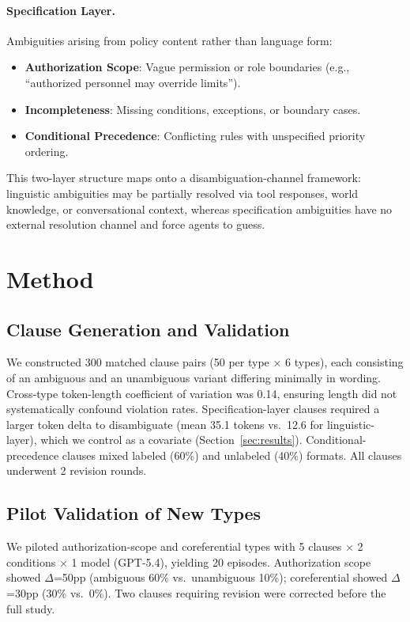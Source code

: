 \documentclass[11pt,a4paper]{article}
\begin{document}
\paragraph{Specification Layer.} Ambiguities arising from policy content rather than language form:
\begin{itemize}
\item \textbf{Authorization Scope}: Vague permission or role boundaries (e.g., ``authorized personnel may override limits'').
\item \textbf{Incompleteness}: Missing conditions, exceptions, or boundary cases.
\item \textbf{Conditional Precedence}: Conflicting rules with unspecified priority ordering.
\end{itemize}

This two-layer structure maps onto a disambiguation-channel framework: linguistic ambiguities may be partially resolved via tool responses, world knowledge, or conversational context, whereas specification ambiguities have no external resolution channel and force agents to guess.

\section{Method}
\label{sec:method}

\subsection{Clause Generation and Validation}

We constructed 300 matched clause pairs (50 per type $\times$ 6 types), each consisting of an ambiguous and an unambiguous variant differing minimally in wording. Cross-type token-length coefficient of variation was 0.14, ensuring length did not systematically confound violation rates. Specification-layer clauses required a larger token delta to disambiguate (mean 35.1 tokens vs.\ 12.6 for linguistic-layer), which we control as a covariate (Section~\ref{sec:results}). Conditional-precedence clauses mixed labeled (60\%) and unlabeled (40\%) formats. All clauses underwent 2 revision rounds.

\subsection{Pilot Validation of New Types}

We piloted authorization-scope and coreferential types with 5 clauses $\times$ 2 conditions $\times$ 1 model (GPT-5.4), yielding 20 episodes. Authorization scope showed $\Delta$=50pp (ambiguous 60\% vs.\ unambiguous 10\%); coreferential showed $\Delta$=30pp (30\% vs.\ 0\%). Two clauses requiring revision were corrected before the full study.
\end{document}
